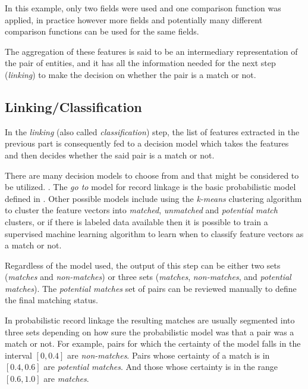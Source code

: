 \documentclass[epsfig,a4paper,11pt,titlepage,twoside,openany]{book}
\begin{document}
In this example, only two fields were used and one comparison function was applied, in practice
however more fields and potentially many different comparison
functions can be used for the same fields.

The aggregation of these features is said to be an intermediary representation
of the pair of entities, and it has all the information needed for the next step
(\textit{linking}) to make the decision on whether the pair is a match or not.

  
\subsection{Linking/Classification}
\label{sec:rl-workflow-linking}

In the \textit{linking} (also called \textit{classification}) step, the list of features extracted in the previous part is consequently fed to a decision model which takes the features and then decides whether the said pair is a match or not.

There are many decision models to choose from and that might be considered to be utilized. \cite{gu06_decis_model_recor_linkag}.
The \textit{go to} model for record linkage is the basic probabilistic model defined in
\cite{fellegi69_theor_recor_linkag}. Other possible models \cite{Elfeky} include
using the \textit{k-means} \cite{Hartigan1979} clustering algorithm to cluster
the feature vectors into \textit{matched}, \textit{unmatched} and
\textit{potential match} clusters, or if there is labeled data available then
it is possible to train a supervised machine learning algorithm to learn when to classify
feature vectors as a match or not.

Regardless of the model used, the output of this step can be either two sets
(\textit{matches} and \textit{non-matches}) or three sets (\textit{matches},
\textit{non-matches}, and \textit{potential matches}). The \textit{potential matches} set of pairs can be reviewed manually to define the final matching
status.

In probabilistic record linkage \cite{fellegi69_theor_recor_linkag} the
resulting matches are usually segmented into three sets depending on how sure
the probabilistic model was that a pair was a match or not. For example, pairs
for which the certainty of the model falls in the interval $[0, 0.4]$ are
\textit{non-matches}. Pairs whose certainty of a match is in $[0.4, 0.6]$ are
\textit{potential matches}. And those whose certainty is in the range $[0.6,
1.0]$ are \textit{matches}.
\end{document}
